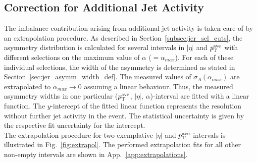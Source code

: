 \subsection{Correction for Additional Jet Activity}
\label{subsec:jer_corrections_alpha}
The imbalance contribution arising from additional jet activity is taken care of by an extrapolation procedure. As described in Section~\ref{subsec:jer_sel_cuts}, the asymmetry distribution is calculated for several intervals in $|\eta|$ and $p_{\text{T}}^\mathrm{ave}$ with different selections on the maximum value of $\alpha$ ($=\alpha_{max}$). For each of these individual selections, the width of the asymmetry is determined as stated in Section~\ref{sec:jer_asymm_width_def}. The measured values of $\sigma_{A}(\alpha_{max})$ are extrapolated to $\alpha_{max} \rightarrow 0$ assuming a linear behaviour. Thus, the measured asymmetry widths in one particular ($p_{\text{T}}^\mathrm{ave}$, $|\eta|$, $\alpha$)-interval are fitted with a linear function. The $y$-intercept of the fitted linear function represents the resolution without further jet activity in the event. The statistical uncertainty is given by the respective fit uncertainty for the intercept. \\
The extrapolation procedure for two exemplative $|\eta|$ and $p_{\text{T}}^\mathrm{ave}$ intervals is illustrated in Fig.~\ref{fig:extrapol}. The performed extrapolation fits for all other non-empty intervals are shown in App.~\ref{app:extrapolations}. 
